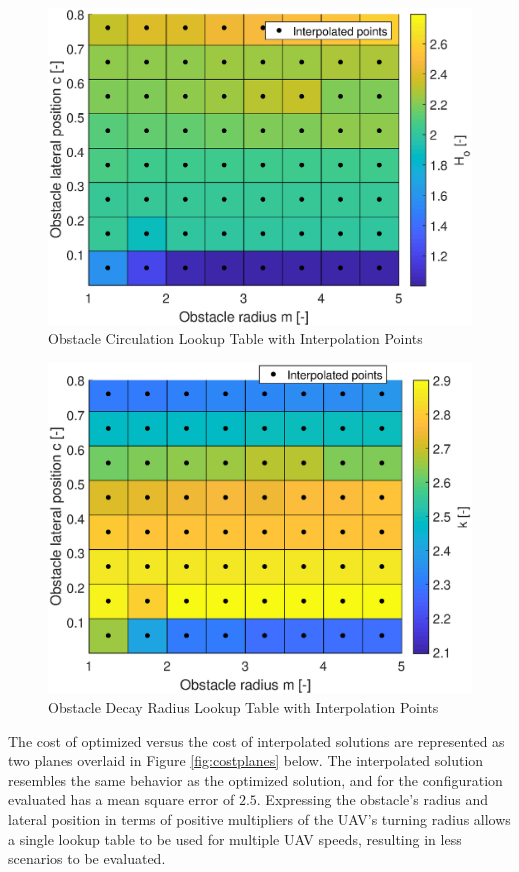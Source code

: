 \documentclass[numbered,pdftex]{ohio-etd}
\begin{document}
\begin{figure}[H]
	\centering
	\includegraphics[width=12cm]{PaperFigures/Methods/LookupTable/hTableInterpolationPoints}
	\caption{Obstacle Circulation Lookup Table with Interpolation Points}
	\label{fig:htableInterp}
\end{figure}


\begin{figure}[H]
	\centering
	\includegraphics[width=12cm]{PaperFigures/Methods/LookupTable/kTableInterpolationPoints}
	\caption{Obstacle Decay Radius Lookup Table with Interpolation Points}
	\label{fig:ktableInterp}
\end{figure}

The cost of optimized versus the cost of interpolated solutions are represented as two planes overlaid in Figure \ref{fig:costplanes} below. The interpolated solution resembles the same behavior as the optimized solution, and for the configuration evaluated has a mean square error of $2.5$. Expressing the obstacle's radius and lateral position in terms of positive multipliers of the UAV's turning radius allows a single lookup table to be used for multiple UAV speeds, resulting in less scenarios to be evaluated.
\end{document}
